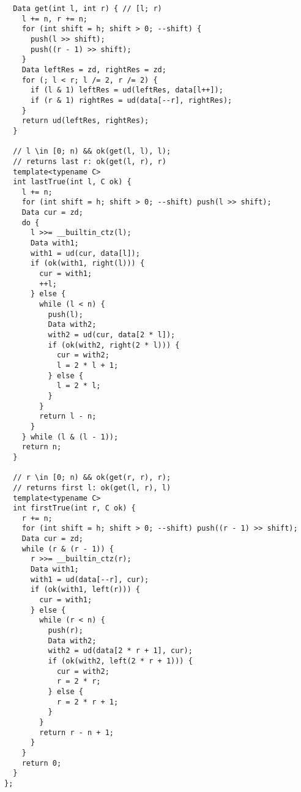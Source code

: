 \begin{lstlisting}
  Data get(int l, int r) { // [l; r)
    l += n, r += n;
    for (int shift = h; shift > 0; --shift) {
      push(l >> shift);
      push((r - 1) >> shift);
    }
    Data leftRes = zd, rightRes = zd;
    for (; l < r; l /= 2, r /= 2) {
      if (l & 1) leftRes = ud(leftRes, data[l++]);
      if (r & 1) rightRes = ud(data[--r], rightRes);
    }
    return ud(leftRes, rightRes);
  }

  // l \in [0; n) && ok(get(l, l), l);
  // returns last r: ok(get(l, r), r)
  template<typename C>
  int lastTrue(int l, C ok) {
    l += n;
    for (int shift = h; shift > 0; --shift) push(l >> shift);
    Data cur = zd;
    do {
      l >>= __builtin_ctz(l);
      Data with1;
      with1 = ud(cur, data[l]);
      if (ok(with1, right(l))) {
        cur = with1;
        ++l;
      } else {
        while (l < n) {
          push(l);
          Data with2;
          with2 = ud(cur, data[2 * l]);
          if (ok(with2, right(2 * l))) {
            cur = with2;
            l = 2 * l + 1;
          } else {
            l = 2 * l;
          }
        }
        return l - n;
      }
    } while (l & (l - 1));
    return n;
  }

  // r \in [0; n) && ok(get(r, r), r);
  // returns first l: ok(get(l, r), l)
  template<typename C>
  int firstTrue(int r, C ok) {
    r += n;
    for (int shift = h; shift > 0; --shift) push((r - 1) >> shift);
    Data cur = zd;
    while (r & (r - 1)) {
      r >>= __builtin_ctz(r);
      Data with1;
      with1 = ud(data[--r], cur);
      if (ok(with1, left(r))) {
        cur = with1;
      } else {
        while (r < n) {
          push(r);
          Data with2;
          with2 = ud(data[2 * r + 1], cur);
          if (ok(with2, left(2 * r + 1))) {
            cur = with2;
            r = 2 * r;
          } else {
            r = 2 * r + 1;
          }
        }
        return r - n + 1;
      }
    }
    return 0;
  }
};
\end{lstlisting}
